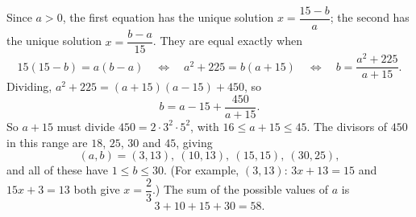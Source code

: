 Since $a>0$, the first equation has the unique solution $x=\dfrac{15-b}{a}$; the second has the unique solution $x=\dfrac{b-a}{15}$. They are equal exactly when
\[
15(15-b)=a(b-a)\quad\Longleftrightarrow\quad a^2+225=b(a+15)\quad\Longleftrightarrow\quad b=\dfrac{a^2+225}{a+15}.
\]
Dividing, $a^2+225=(a+15)(a-15)+450$, so
\[
b=a-15+\dfrac{450}{a+15}.
\]
So $a+15$ must divide $450=2\cdot3^2\cdot5^2$, with $16\le a+15\le45$. The divisors of $450$ in this range are $18$, $25$, $30$ and $45$, giving
\[
(a,b)=(3,13),\ (10,13),\ (15,15),\ (30,25),
\]
and all of these have $1\le b\le30$. (For example, $(3,13)$: $3x+13=15$ and $15x+3=13$ both give $x=\dfrac{2}{3}$.) The sum of the possible values of $a$ is
\[
3+10+15+30=\boxed{58}.
\]
